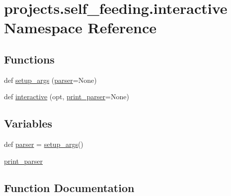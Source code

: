 \hypertarget{namespaceprojects_1_1self__feeding_1_1interactive}{}\section{projects.\+self\+\_\+feeding.\+interactive Namespace Reference}
\label{namespaceprojects_1_1self__feeding_1_1interactive}
\subsection*{Functions}
\begin{DoxyCompactItemize}
\item 
def \hyperlink{namespaceprojects_1_1self__feeding_1_1interactive_a2ad3b874d9caef6e76ea41e029b933f0}{setup\+\_\+args} (\hyperlink{namespaceprojects_1_1self__feeding_1_1interactive_abee9c3a7fd264e2b68724476c79beda7}{parser}=None)
\item 
def \hyperlink{namespaceprojects_1_1self__feeding_1_1interactive_aaebd4c577ab0371c73e8442be469ebab}{interactive} (opt, \hyperlink{namespaceprojects_1_1self__feeding_1_1interactive_a066fbd25c1838df96d5bd360e85cf30b}{print\+\_\+parser}=None)
\end{DoxyCompactItemize}
\subsection*{Variables}
\begin{DoxyCompactItemize}
\item 
def \hyperlink{namespaceprojects_1_1self__feeding_1_1interactive_abee9c3a7fd264e2b68724476c79beda7}{parser} = \hyperlink{namespaceprojects_1_1self__feeding_1_1interactive_a2ad3b874d9caef6e76ea41e029b933f0}{setup\+\_\+args}()
\item 
\hyperlink{namespaceprojects_1_1self__feeding_1_1interactive_a066fbd25c1838df96d5bd360e85cf30b}{print\+\_\+parser}
\end{DoxyCompactItemize}


\subsection{Function Documentation}
\mbox{\label{namespaceprojects_1_1self__feeding_1_1interactive_aaebd4c577ab0371c73e8442be469ebab}} 
